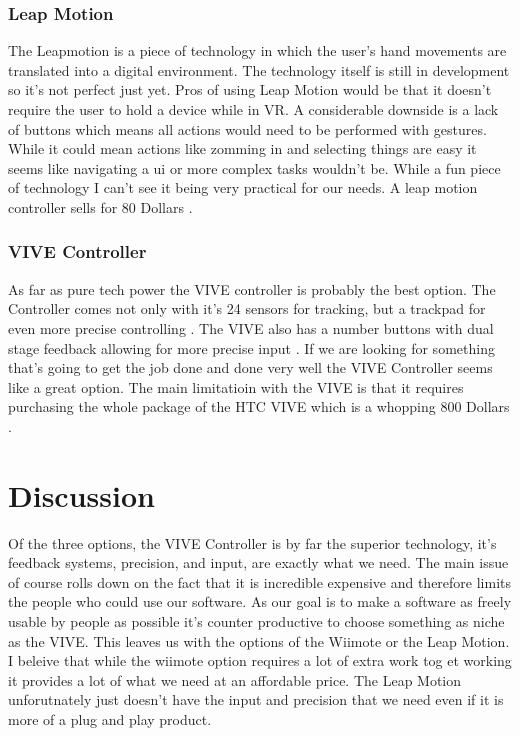 \documentclass{article}
\begin{document}
\subsubsection{Leap Motion}
The Leapmotion is a piece of technology in which the user's hand movements are translated into a digital environment. 
The technology itself is still in development so it's not perfect just yet.
Pros of using Leap Motion would be that it doesn't require the user to hold a device while in VR.
A considerable downside is a lack of buttons which means all actions would need to be performed with gestures. 
While it could mean actions like zomming in and selecting things are easy it seems like navigating a ui or more complex tasks wouldn't be.
While a fun piece of technology I can't see it being very practical for our needs.
A leap motion controller sells for 80 Dollars \cite{leaphardware}.

\subsubsection{VIVE Controller}
As far as pure tech power the VIVE controller is probably the best option. 
The Controller comes not only with it's 24 sensors for tracking, but a trackpad for even more precise controlling \cite{vivehardware}.
The VIVE also has a number buttons with dual stage feedback allowing for more precise input \cite{vivehardware}.
If we are looking for something that's going to get the job done and done very well the VIVE Controller seems like a great option.
The main limitatioin with the VIVE is that it requires purchasing the whole package of the HTC VIVE which is a whopping 800 Dollars \cite{vivehardware}.

\section{Discussion}
Of the three options, the VIVE Controller is by far the superior technology, it's feedback systems, precision, and input, are exactly what we need.
The main issue of course rolls down on the fact that it is incredible expensive and therefore limits the people who could use our software.
As our goal is to make a software as freely usable by people as possible it's counter productive to choose something as niche as the VIVE.
This leaves us with the options of the Wiimote or the Leap Motion.
I beleive that while the wiimote option requires a lot of extra work tog et working it provides a lot of what we need at an affordable price.
The Leap Motion unforutnately just doesn't have the input and precision that we need even if it is more of a plug and play product.
\end{document}
